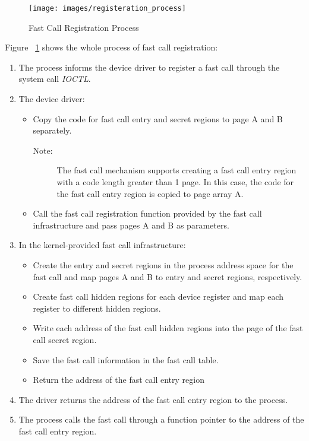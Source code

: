 \begin{figure}[tbp]
  \centering
  \texttt{[image: images/registeration\_process]}
  \caption[Short description]{Fast Call Registration Process}
  \label{fig:registeration_process}
\end{figure}

Figure ~\ref{fig:registeration_process} shows the whole process of fast call registration:
\begin{enumerate}
  \item The process informs the device driver to register a fast call through the system call \emph{IOCTL}.
  \item The device driver:
    \begin{itemize}
      \item Copy the code for fast call entry and secret regions to page A and B separately.
        \begin{description}
          \item[Note:] The fast call mechanism supports creating a fast call entry region with a code length greater than 1 page. In this case, the code for the fast call entry region is copied to page array A.
        \end{description}
      \item Call the fast call registration function provided by the fast call infrastructure and pass pages A and B as parameters.
    \end{itemize}
  \item In the kernel-provided fast call infrastructure:
    \begin{itemize}
      \item Create the entry and secret regions in the process address space for the fast call and map pages A and B to entry and secret regions, respectively.
      \item Create fast call hidden regions for each device register and map each register to different hidden regions.
      \item Write each address of the fast call hidden regions into the page of the fast call secret region.
      \item Save the fast call information in the fast call table.
      \item Return the address of the fast call entry region
    \end{itemize}
  \item The driver returns the address of the fast call entry region to the process.
  \item The process calls the fast call through a function pointer to the address of the fast call entry region.
\end{enumerate}


